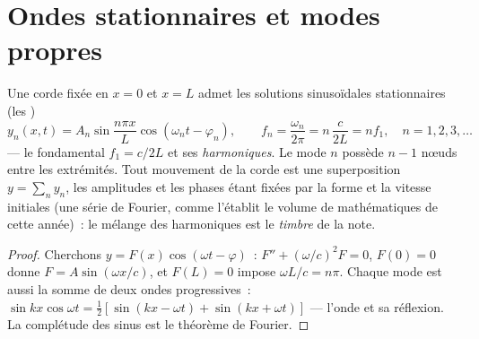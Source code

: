 \section{Ondes stationnaires et modes propres}

\begin{proposition}\label{prop:b2:waves-on-strings:modes}
Une corde fixée en $x = 0$ et $x = L$ admet les solutions sinusoïdales
stationnaires (les \emph{})
\[
y_n(x, t) = A_n\sin\frac{n\pi x}{L}\cos(\omega_nt - \varphi_n) , \qquad
f_n = \frac{\omega_n}{2\pi} = n\,\frac{c}{2L} = n f_1 , \quad n = 1, 2, 3, \dots
\]
--- le fondamental $f_1 = c/2L$ et ses \emph{harmoniques}. Le mode $n$ possède
$n - 1$ nœuds entre les extrémités. Tout mouvement de la corde est une
superposition $y = \sum_ny_n$, les amplitudes et les phases étant fixées par
la forme et la vitesse initiales (une série de Fourier, comme l'établit le
volume de mathématiques de cette année)~: le mélange des harmoniques est le
\emph{timbre} de la note.
\end{proposition}

\begin{proof}
Cherchons $y = F(x)\cos(\omega t - \varphi)$~: $F'' + (\omega/c)^2F = 0$, $F(0) = 0$ donne
$F = A\sin(\omega x/c)$, et $F(L) = 0$ impose $\omega L/c = n\pi$. Chaque mode est
aussi la somme de deux ondes progressives~: $\sin kx\cos\omega t = \tfrac12[\sin(kx -
\omega t) + \sin(kx + \omega t)]$ --- l'onde et sa réflexion. La
complétude des sinus est le théorème de Fourier.
\end{proof}

